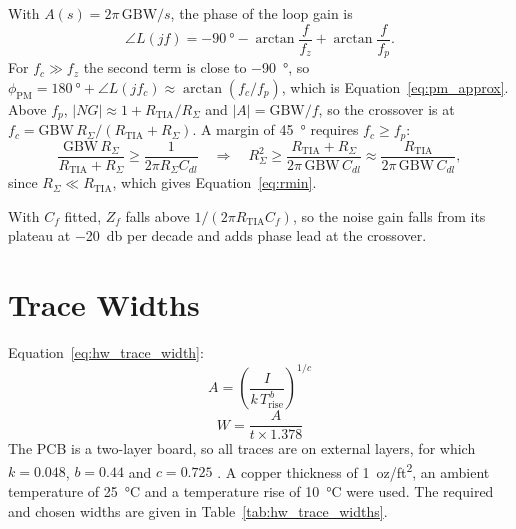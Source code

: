 With $A(s) = 2\pi\,\mathrm{GBW}/s$, the phase of the loop gain is
\begin{equation}
  \angle L(jf) = \SI{-90}{\degree} - \arctan\frac{f}{f_z} + \arctan\frac{f}{f_p}.
\end{equation}
For $f_c \gg f_z$ the second term is close to \SI{-90}{\degree}, so
$\phi_\mathrm{PM} = \SI{180}{\degree} + \angle L(jf_c) \approx
\arctan(f_c/f_p)$, which is Equation~\eqref{eq:pm_approx}. Above $f_p$,
$|NG| \approx 1 + R_\mathrm{TIA}/R_\Sigma$ and $|A| = \mathrm{GBW}/f$, so the
crossover is at $f_c = \mathrm{GBW}\,R_\Sigma/(R_\mathrm{TIA}+R_\Sigma)$. A
margin of \SI{45}{\degree} requires $f_c \geq f_p$:
\begin{equation}
  \frac{\mathrm{GBW}\,R_\Sigma}{R_\mathrm{TIA}+R_\Sigma} \geq
  \frac{1}{2\pi R_\Sigma C_{dl}}
  \quad\Longrightarrow\quad
  R_\Sigma^2 \geq \frac{R_\mathrm{TIA}+R_\Sigma}{2\pi\,\mathrm{GBW}\,C_{dl}}
  \approx \frac{R_\mathrm{TIA}}{2\pi\,\mathrm{GBW}\,C_{dl}},
\end{equation}
since $R_\Sigma \ll R_\mathrm{TIA}$, which gives Equation~\eqref{eq:rmin}.

With $C_f$ fitted, $Z_f$ falls above $1/(2\pi R_\mathrm{TIA}C_f)$, so the
noise gain falls from its plateau at \SI{-20}{\decibel} per decade and adds
phase lead at the crossover.

\newpage

\section{Trace Widths}
\label{app:trace_width}

Equation~\eqref{eq:hw_trace_width}:
\begin{equation}
  A = \left( \frac{I}{k \, T_\text{rise}^{\,b}} \right)^{1/c}
  \label{eq:hw_trace_area}
\end{equation}
\begin{equation}
  W = \frac{A}{t \times 1.378}
  \label{eq:hw_trace_width}
\end{equation}
The PCB is a two-layer board, so all traces are on external layers, for which
$k = 0.048$, $b = 0.44$ and $c = 0.725$ \cite{digikey_tracewidth}. A copper thickness of
1~oz/ft\textsuperscript{2}, an ambient temperature of \SI{25}{\celsius} and a
temperature rise of \SI{10}{\celsius} were used. The required and chosen
widths are given in Table~\ref{tab:hw_trace_widths}.

